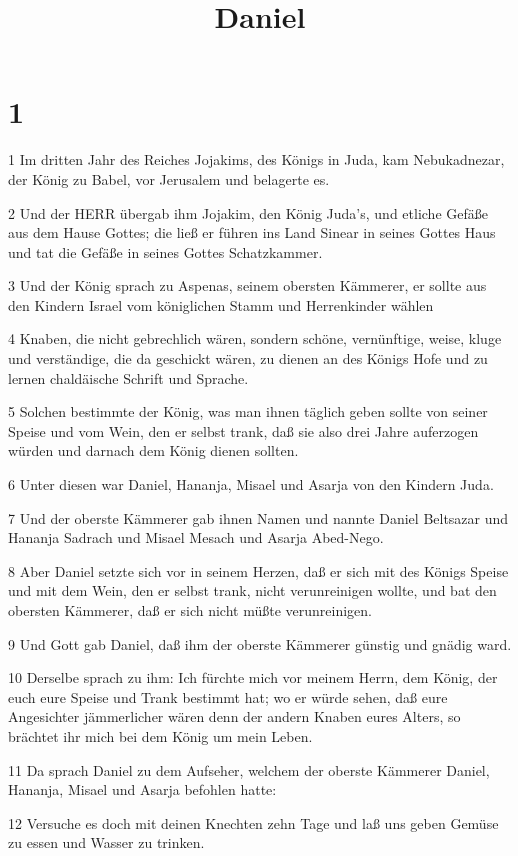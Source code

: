 

\title{Daniel}


\chapter{1}

\par 1 Im dritten Jahr des Reiches Jojakims, des Königs in Juda, kam Nebukadnezar, der König zu Babel, vor Jerusalem und belagerte es.
\par 2 Und der HERR übergab ihm Jojakim, den König Juda's, und etliche Gefäße aus dem Hause Gottes; die ließ er führen ins Land Sinear in seines Gottes Haus und tat die Gefäße in seines Gottes Schatzkammer.
\par 3 Und der König sprach zu Aspenas, seinem obersten Kämmerer, er sollte aus den Kindern Israel vom königlichen Stamm und Herrenkinder wählen
\par 4 Knaben, die nicht gebrechlich wären, sondern schöne, vernünftige, weise, kluge und verständige, die da geschickt wären, zu dienen an des Königs Hofe und zu lernen chaldäische Schrift und Sprache.
\par 5 Solchen bestimmte der König, was man ihnen täglich geben sollte von seiner Speise und vom Wein, den er selbst trank, daß sie also drei Jahre auferzogen würden und darnach dem König dienen sollten.
\par 6 Unter diesen war Daniel, Hananja, Misael und Asarja von den Kindern Juda.
\par 7 Und der oberste Kämmerer gab ihnen Namen und nannte Daniel Beltsazar und Hananja Sadrach und Misael Mesach und Asarja Abed-Nego.
\par 8 Aber Daniel setzte sich vor in seinem Herzen, daß er sich mit des Königs Speise und mit dem Wein, den er selbst trank, nicht verunreinigen wollte, und bat den obersten Kämmerer, daß er sich nicht müßte verunreinigen.
\par 9 Und Gott gab Daniel, daß ihm der oberste Kämmerer günstig und gnädig ward.
\par 10 Derselbe sprach zu ihm: Ich fürchte mich vor meinem Herrn, dem König, der euch eure Speise und Trank bestimmt hat; wo er würde sehen, daß eure Angesichter jämmerlicher wären denn der andern Knaben eures Alters, so brächtet ihr mich bei dem König um mein Leben.
\par 11 Da sprach Daniel zu dem Aufseher, welchem der oberste Kämmerer Daniel, Hananja, Misael und Asarja befohlen hatte:
\par 12 Versuche es doch mit deinen Knechten zehn Tage und laß uns geben Gemüse zu essen und Wasser zu trinken.
